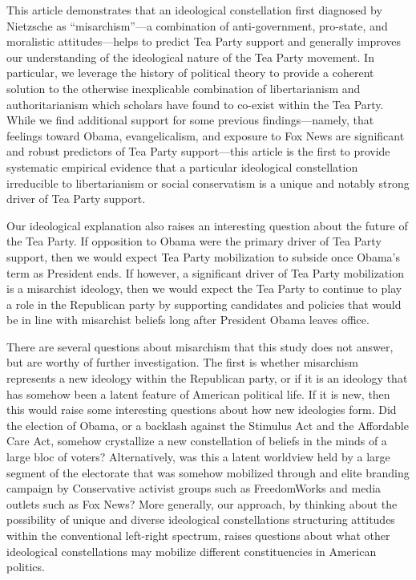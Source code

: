 \documentclass[12pt,]{article}
\begin{document}
This article demonstrates that an ideological constellation first
diagnosed by Nietzsche as ``misarchism''---a combination of
anti-government, pro-state, and moralistic attitudes---helps to predict
Tea Party support and generally improves our understanding of the
ideological nature of the Tea Party movement. In particular, we leverage
the history of political theory to provide a coherent solution to the
otherwise inexplicable combination of libertarianism and
authoritarianism which scholars have found to co-exist within the Tea
Party. While we find additional support for some previous
findings---namely, that feelings toward Obama, evangelicalism, and
exposure to Fox News are significant and robust predictors of Tea Party
support---this article is the first to provide systematic empirical
evidence that a particular ideological constellation irreducible to
libertarianism or social conservatism is a unique and notably strong
driver of Tea Party support.

Our ideological explanation also raises an interesting question about
the future of the Tea Party. If opposition to Obama were the primary
driver of Tea Party support, then we would expect Tea Party mobilization
to subside once Obama's term as President ends. If however, a
significant driver of Tea Party mobilization is a misarchist ideology,
then we would expect the Tea Party to continue to play a role in the
Republican party by supporting candidates and policies that would be in
line with misarchist beliefs long after President Obama leaves office.

There are several questions about misarchism that this study does not
answer, but are worthy of further investigation. The first is whether
misarchism represents a new ideology within the Republican party, or if
it is an ideology that has somehow been a latent feature of American
political life. If it is new, then this would raise some interesting
questions about how new ideologies form. Did the election of Obama, or a
backlash against the Stimulus Act and the Affordable Care Act, somehow
crystallize a new constellation of beliefs in the minds of a large bloc
of voters? Alternatively, was this a latent worldview held by a large
segment of the electorate that was somehow mobilized through and elite
branding campaign by Conservative activist groups such as FreedomWorks
and media outlets such as Fox News? More generally, our approach, by
thinking about the possibility of unique and diverse ideological
constellations structuring attitudes within the conventional left-right
spectrum, raises questions about what other ideological constellations
may mobilize different constituencies in American politics.
\end{document}
